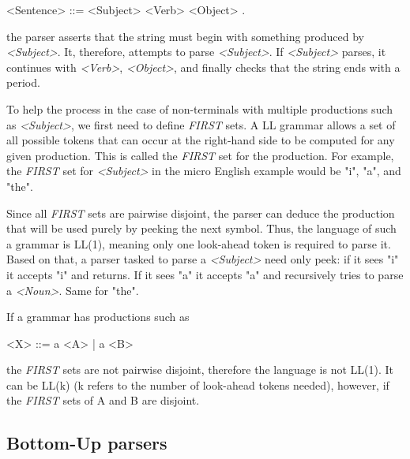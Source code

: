 \begin{grammar}
<Sentence> ::= <Subject> <Verb> <Object> .
\end{grammar}

the parser asserts that the string must begin with something produced by \textit{<Subject>}. It, therefore, attempts to parse \textit{<Subject>}. If \textit{<Subject>} parses, it continues with \textit{<Verb>}, \textit{<Object>}, and finally checks that the string ends with a period.
 
\par
To help the process in the case of non-terminals with multiple productions such as \textit{<Subject>}, we first need to define \textit{FIRST} sets. A LL grammar allows a set of all possible tokens that can occur at the right-hand side to be computed for any given production. This is called the \textit{FIRST} set for the production. For example, the \textit{FIRST} set for \textit{<Subject>} in the micro English example would be "i", "a", and "the".
\par
Since all \textit{FIRST} sets are pairwise disjoint, the parser can deduce the production that will be used purely by peeking the next symbol. Thus, the language of such a grammar is LL(1), meaning only one look-ahead token is required to parse it. Based on that, a parser tasked to parse a \textit{<Subject>} need only peek: if it sees "i" it accepts "i" and returns. If it sees "a" it accepts "a" and recursively tries to parse a \textit{<Noun>}. Same for "the". 
\par
If a grammar has productions such as

\begin{grammar}
<X> ::= a <A> | a <B>
\end{grammar}

the \textit{FIRST} sets are not pairwise disjoint, therefore the language is not LL(1). It can be LL(k) (k refers to the number of look-ahead tokens needed), however, if the \textit{FIRST} sets of A and B are disjoint. 


\subsection{Bottom-Up parsers}

